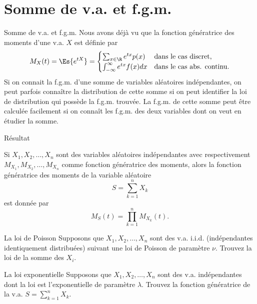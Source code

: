 \documentclass[nuit,charter,pied]{BeamerJS}
\begin{document}
\section[f.g.m.]{Somme de v.a. et f.g.m.}
\begin{frame}{Somme de v.a. et f.g.m.}
	\pause
	Nous avons déjà vu que la fonction génératrice des moments d'une v.a. $X$ est définie par
	\[M_X(t)=\Es{e^{tX}}=\begin{cases}\sum_{x\in\R}e^{tx}p(x)&\text{dans le cas discret,}\\
		\int_{-\infty}^{\infty}e^{tx}f(x)dx&\text{dans le cas abs. continu.}
	\end{cases}\]
	Si on connait la f.g.m. d'une somme de variables aléatoires indépendantes, on peut parfois connaître la distribution de cette somme si on peut identifier la loi de distribution qui possède la f.g.m. trouvée. La f.g.m. de cette somme peut être calculée facilement si on connaît les f.g.m. des deux variables dont on veut en étudier la somme.
\end{frame}
\begin{frame}{Résultat}
	\begin{prop}
		Si $X_1,X_2,\ldots,X_n$ sont des variables aléatoires indépendantes avec respectivement $M_{X_1},M_{X_2},\ldots,M_{X_n}$ comme fonction génératrice des moments, alors la fonction génératrice des moments de la variable aléatoire \[S=\sum_{k=1}^nX_k\] est donnée par
		\[M_S(t)=\prod_{k=1}^n M_{X_k}(t).\]
	\end{prop}
\end{frame}

\begin{frame}[t]{La loi de Poisson}
	Supposons que $X_1, X_2,\ldots, X_n$ sont des v.a. i.i.d. (indépendantes identiquement distribuées) suivant une loi de Poisson de paramètre $\nu$. Trouvez la loi de la somme des $X_i$.
\end{frame}
\begin{frame}[t]{La loi exponentielle}
	Supposons que $X_1, X_2,\ldots, X_n$ sont des v.a. indépendantes dont la loi est l'exponentielle de paramètre $\lambda$. Trouvez la fonction génératrice de la v.a. $S=\sum_{k=1}^nX_k$.
\end{frame}
\end{document}

